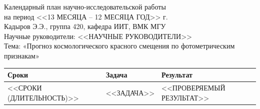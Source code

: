 \documentclass[a4paper,11pt]{article}
\begin{document}
\begin{center}
{\Large Календарный план научно-исследовательской работы}\\[4pt]
{\large на период <<13 МЕСЯЦА – 12 МЕСЯЦА ГОД>> г.}\\[8pt]
Кадыров Э.Э., группа 420, кафедра ИИТ, ВМК МГУ\\
Научные руководители: <<НАУЧНЫЕ РУКОВОДИТЕЛИ>>\\[4pt]
Тема: «Прогноз космологического красного смещения по фотометрическим признакам»
\end{center}

\begin{longtable}{>{\raggedright\arraybackslash}p{2.9cm}>{\raggedright\arraybackslash}p{7.2cm}>{\raggedright\arraybackslash}p{5.2cm}}
\toprule
Сроки & Задача & Результат \\
\midrule
\endhead
<<СРОКИ (ДЛИТЕЛЬНОСТЬ)>> &
<<ЗАДАЧА>> &
<<ПРОВЕРЯЕМЫЙ РЕЗУЛЬТАТ>> \\
\bottomrule
\end{longtable}
\end{document}
